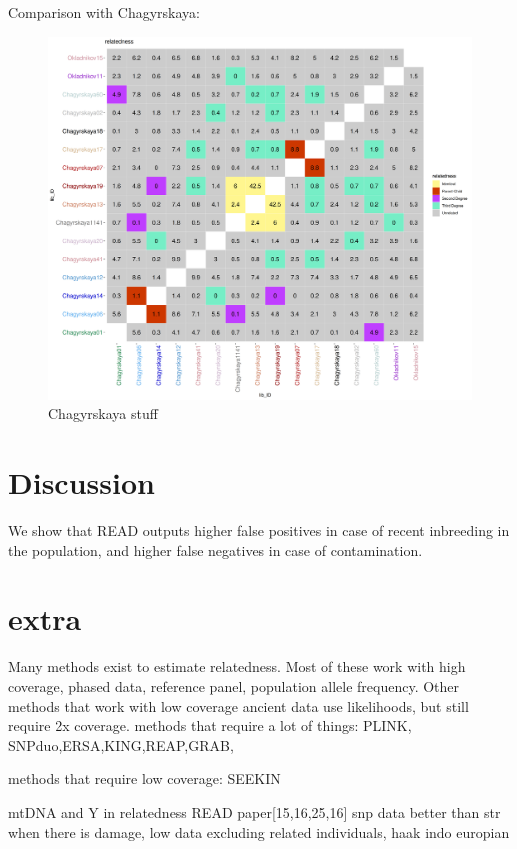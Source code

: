 \documentclass[12pt, letterpaper]{article}
\begin{document}
Comparison with Chagyrskaya:
\begin{figure}[htp]
    \centering
    \includegraphics[width=18cm]{fil0_relatable_plot.png}
    \caption{Chagyrskaya stuff}
    \label{fig:galaxy}
\end{figure}





\section{Discussion}

We show that READ outputs higher false positives in case of recent inbreeding in the population, and higher false negatives in case of contamination. 


\section{extra}
Many methods exist to estimate relatedness. Most of these work with high coverage, phased data, reference panel, population allele frequency. Other methods that work with low coverage ancient data use likelihoods, but still require 2x coverage.
methods that require a lot of things: PLINK, SNPduo,ERSA,KING,REAP,GRAB,

methods that require low coverage: SEEKIN

mtDNA and Y in relatedness READ paper[15,16,25,16]
snp data better than str when there is damage, low data
excluding related individuals, haak indo europian
\end{document}
